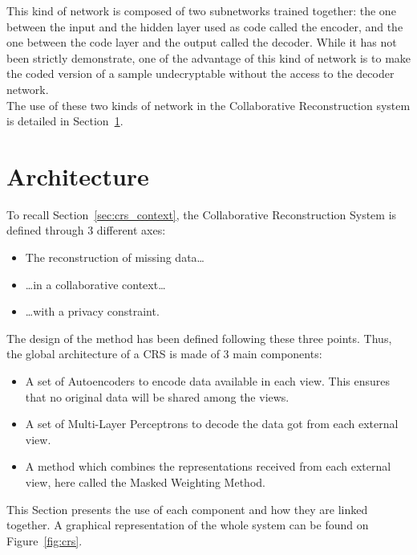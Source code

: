 \documentclass[a4paper]{report}
\begin{document}
    This kind of network is composed of two subnetworks trained together: the one between the input and the hidden layer used as code called the encoder, and the one between the code layer and the output called the decoder. While it has not been strictly demonstrate, one of the advantage of this kind of network is to make the coded version of a sample undecryptable without the access to the decoder network.\\

    The use of these two kinds of network in the Collaborative Reconstruction system is detailed in Section~\ref{sec:archi}.

\section{Architecture}
\label{sec:archi}

To recall Section~\ref{sec:crs_context}, the Collaborative Reconstruction System is defined through 3 different axes:

\begin{itemize}
    \item The reconstruction of missing data\dots
    \item \dots in a collaborative context\dots
    \item \dots with a privacy constraint.
\end{itemize}

The design of the method has been defined following these three points. Thus, the global architecture of a CRS is made of 3 main components:

\begin{itemize}
    \item A set of Autoencoders to encode data available in each view. This ensures that no original data will be shared among the views.
    \item A set of Multi-Layer Perceptrons to decode the data got from each external view.
    \item A method which combines the representations received from each external view, here called the Masked Weighting Method.
\end{itemize}

This Section presents the use of each component and how they are linked together. A graphical representation of the whole system can be found on Figure~\ref{fig:crs}.
\end{document}
